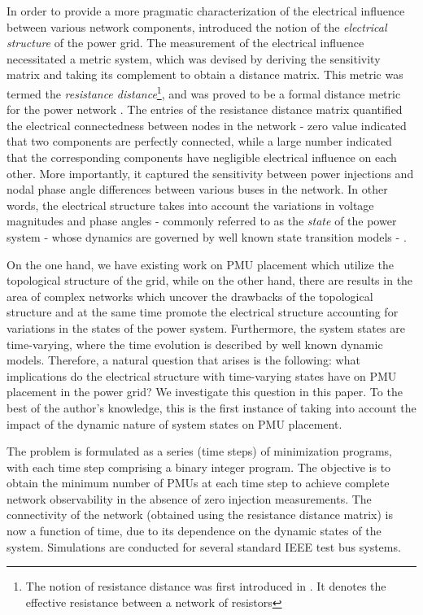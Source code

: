 \documentclass[10pt,journal,twocolumn]{IEEEtran}\IEEEoverridecommandlockouts
\begin{document}
In order to provide a more pragmatic characterization of the electrical influence between various network components, \cite{Cotilla-Sanchez2012} introduced the notion of the \emph{electrical structure} of the power grid. The measurement of the electrical influence necessitated a metric system, which was devised by deriving the sensitivity matrix and taking its complement to obtain a distance matrix. This metric was termed the \emph{resistance distance}\footnote{The notion of resistance distance was first introduced in \cite{Klein1993}. It denotes the effective resistance between a network of resistors}, and was proved to be a formal distance metric for the power network \cite[Appendix]{Cotilla-Sanchez2012}. The entries of the resistance distance matrix quantified the electrical connectedness between nodes in the network - zero value indicated that two components are perfectly connected, while a large number indicated that the corresponding components have negligible electrical influence on each other. More importantly, it captured the sensitivity between power injections and nodal phase angle differences between various buses in the network. In other words, the electrical structure takes into account the variations in voltage magnitudes and phase angles - commonly referred to as the \emph{state} of the power system - whose dynamics are governed by well known state transition models \cite{Debs1970} - \nocite{Nishiya1982}\nocite{LeitedaSilva1983}\nocite{Morvaj1985}\nocite{Durgaprasad1998}\nocite{BrownDoCouttoFilho2009}
\cite{Hassanzadeh2012}.

On the one hand, we have existing work on PMU placement which utilize the topological structure of the grid, while on the other hand, there are results in the area of complex networks which uncover the drawbacks of the topological structure and at the same time promote the electrical structure accounting for variations in the states of the power system. Furthermore, the system states are time-varying, where the time evolution is described by well known dynamic models. Therefore, a natural question that arises is the following: what implications do the electrical structure with time-varying states have on PMU placement in the power grid? We investigate this question in this paper. To the best of the author's knowledge, this is the first instance of taking into account the impact of the dynamic nature of system states on PMU placement.

The problem is formulated as a series (time steps) of minimization programs, with each time step comprising a binary integer program. The objective is to obtain the minimum number of PMUs at each time step to achieve complete network observability in the absence of zero injection measurements. The connectivity of the network (obtained using the resistance distance matrix) is now a function of time, due to its dependence on the dynamic states of the system. Simulations are conducted for several standard IEEE test bus systems.
\end{document}
